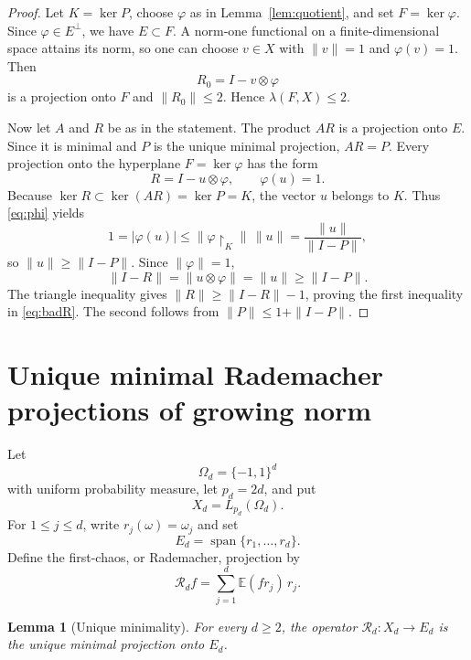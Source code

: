 \documentclass[11pt]{article}
\newtheorem{lemma}[theorem]{Lemma}
\theoremstyle{remark}
\newcommand{\E}{\mathbb{E}}
\newcommand{\Id}{I}
\newcommand{\spann}{\operatorname{span}}
\newcommand{\restr}[2]{#1\!\restriction_{#2}}
\begin{document}
\begin{proof}
Let $K=\ker P$, choose $\varphi$ as in Lemma~\ref{lem:quotient}, and set
$F=\ker\varphi$.  Since $\varphi\in E^\perp$, we have $E\subset F$.
A norm-one functional on a finite-dimensional space attains its norm, so one
can choose $v\in X$ with $\|v\|=1$ and $\varphi(v)=1$.  Then
\[
       R_0=\Id-v\otimes\varphi
\]
is a projection onto $F$ and $\|R_0\|\leq 2$.  Hence
$\lambda(F,X)\leq2$.

Now let $A$ and $R$ be as in the statement.  The product $AR$ is a projection
onto $E$.  Since it is minimal and $P$ is the unique minimal projection,
$AR=P$.  Every projection onto the hyperplane $F=\ker\varphi$ has the form
\[
       R=\Id-u\otimes\varphi,
       \qquad \varphi(u)=1.
\]
Because $\ker R\subset\ker(AR)=\ker P=K$, the vector $u$ belongs to $K$.
Thus \eqref{eq:phi} yields
\[
  1=|\varphi(u)|
    \leq \bigl\|\restr{\varphi}{K}\bigr\|\,\|u\|
    =\frac{\|u\|}{\|\Id-P\|},
\]
so $\|u\|\geq\|\Id-P\|$.  Since $\|\varphi\|=1$,
\[
 \|\Id-R\|=\|u\otimes\varphi\|=\|u\|\geq\|\Id-P\|.
\]
The triangle inequality gives $\|R\|\geq\|\Id-R\|-1$, proving the first
inequality in \eqref{eq:badR}.  The second follows from
$\|P\|\leq1+\|\Id-P\|$.
\end{proof}

\section{Unique minimal Rademacher projections of growing norm}
\label{sec:rademacher}

Let
\[
 \Omega_d=\{-1,1\}^d
\]
with uniform probability measure, let $p_d=2d$, and put
\[
 X_d=L_{p_d}(\Omega_d).
\]
For $1\leq j\leq d$, write $r_j(\omega)=\omega_j$ and set
\[
 E_d=\spann\{r_1,\ldots,r_d\}.
\]
Define the first-chaos, or Rademacher, projection by
\begin{equation}\label{eq:Rd}
 \mathcal R_d f
   =\sum_{j=1}^d \E(f r_j)\,r_j.
\end{equation}

\begin{lemma}[Unique minimality]\label{lem:unique}
For every $d\geq2$, the operator $\mathcal R_d:X_d\to E_d$ is the unique
minimal projection onto $E_d$.
\end{lemma}
\end{document}
